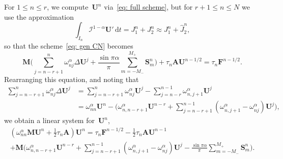 \documentclass[a4paper,12pt]{article}
\newcommand{\bs}[1]{\boldsymbol{#1}}
\newcommand{\ud}{\mathrm{d}}
\begin{document}
For $1\le n\le r$, we compute~$\bs{U}^n$ via~\eqref{eq: full scheme}, but for
$r+1\le n\le N$ we use the approximation
\[
\int_{I_n}\mathcal{I}^{1-\alpha}\bs{U}'\,\ud t=J_1^n+J_2^n
    \approx J_1^n+\hat J_2^n,
\]
so that the scheme~\eqref{eq: gen CN} becomes
\[
\bs{M}\biggl(\sum_{j=n-r+1}^n \omega^\alpha_{nj}\Delta\bs{U}^j
    +\frac{\sin\pi\alpha}{\pi}\sum_{m=-M_-}^{M_+} \bs{S}^n_m\biggr)
    +\tau_n\bs{A}\bs{U}^{n-1/2}=\tau_n\bs{F}^{n-1/2}.
\]
Rearranging this equation, and noting that
\begin{align*}
\sum_{j=n-r+1}^n\omega^\alpha_{nj}\Delta\bs{U}^j
    &=\sum_{j=n-r+1}^n\omega^\alpha_{nj}\bs{U}^j
    -\sum_{j=n-r}^{n-1}\omega^\alpha_{n,j+1}\bs{U}^j\\
    &=\omega^\alpha_{nn}\bs{U}^n-\biggl(\omega^\alpha_{n,n-r+1}\bs{U}^{n-r}
    +\sum_{j=n-r+1}^{n-1}(\omega^\alpha_{n,j+1}-\omega^\alpha_{nj})\bs{U}^j
    \biggr),
\end{align*}
we obtain a linear system for~$\bs{U}^n$,
\begin{multline*}
(\omega^\alpha_{nn}\bs{M}\bs{U}^n+\tfrac12\tau_n\bs{A})\bs{U}^n
    =\tau_n\bs{F}^{n-1/2}-\tfrac12\tau_n\bs{A}\bs{U}^{n-1}\\
    +\bs{M}\biggl(\omega^\alpha_{n,n-r+1}\bs{U}^{n-r}
    +\sum_{j=n-r+1}^{n-1}(\omega^\alpha_{n,j+1}-\omega^\alpha_{nj})\bs{U}^j
    -\frac{\sin\pi\alpha}{\pi}\sum_{m=-M_-}^{M_+}\bs{S}^n_m\biggr).
\end{multline*}
\end{document}
